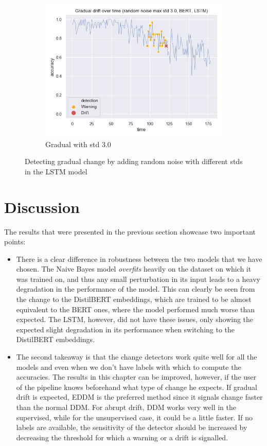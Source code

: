 \documentclass[12pt]{extreport}
\begin{document}
\begin{figure}[H]
\begin{subfigure}{.5\textwidth}
  \centering
  \includegraphics[width=\linewidth]{assets/detecting-change/gradual_noise_random_std_3_lstm_wos_1_BERT.png}
  \caption{Gradual with std 3.0}
  \label{fig:lstm-gradual-std-3}
\end{subfigure}
\caption{Detecting gradual change by adding random noise with different stds in the LSTM model}
\label{fig:lstm-gradual}
\end{figure}

\section{Discussion}

The results that were presented in the previous section showcase two important points:
\begin{itemize}
    \item There is a clear difference in robustness between the two models that we have chosen. The Naive Bayes model \emph{overfits} heavily on the dataset on which it was trained on, and thus any small perturbation in its input leads to a heavy degradation in the performance of the model. This can clearly be seen from the change to the DistilBERT embeddings, which are trained to be almost equivalent to the BERT ones, where the model performed much worse than expected. The LSTM, however, did not have these issues, only showing the expected slight degradation in its performance when switching to the DistilBERT embeddings.
    \item The second takeaway is that the change detectors work quite well for all the models and even when we don't have labels with which to compute the accuracies. The results in this chapter can be improved, however, if the user of the pipeline knows beforehand what type of change he expects. If gradual drift is expected, EDDM is the preferred method since it signals change faster than the normal DDM. For abrupt drift, DDM works very well in the supervised, while for the unsupervised case, it could be a little faster. If no labels are available, the sensitivity of the detector should be increased by decreasing the threshold for which a warning or a drift is signalled.
\end{itemize}
\end{document}
